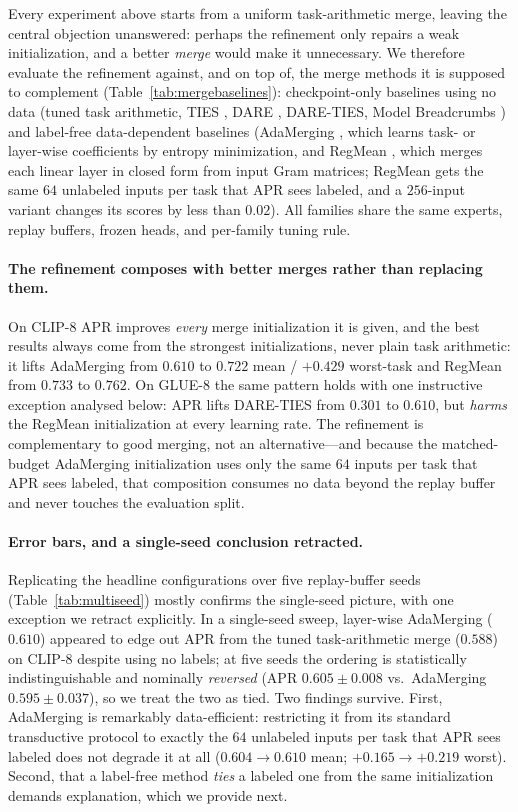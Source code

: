 \documentclass[11pt]{article}
\begin{document}
Every experiment above starts from a uniform task-arithmetic merge, leaving the central objection unanswered: perhaps the refinement only repairs a weak initialization, and a better \emph{merge} would make it unnecessary. We therefore evaluate the refinement against, and on top of, the merge methods it is supposed to complement (Table~\ref{tab:mergebaselines}): checkpoint-only baselines using no data (tuned task arithmetic, TIES \citep{yadav2023ties}, DARE \citep{yu2023dare}, DARE-TIES, Model Breadcrumbs \citep{davari2023breadcrumbs}) and label-free data-dependent baselines (AdaMerging \citep{yang2024adamerging}, which learns task- or layer-wise coefficients by entropy minimization, and RegMean \citep{jin2023regmean}, which merges each linear layer in closed form from input Gram matrices; RegMean gets the same $64$ unlabeled inputs per task that APR sees labeled, and a $256$-input variant changes its scores by less than $0.02$). All families share the same experts, replay buffers, frozen heads, and per-family tuning rule.

\paragraph{The refinement composes with better merges rather than replacing them.}
On CLIP-8 APR improves \emph{every} merge initialization it is given, and the best results always come from the strongest initializations, never plain task arithmetic: it lifts AdaMerging from $0.610$ to $\mathbf{0.722}$ mean / $\mathbf{+0.429}$ worst-task and RegMean from $0.733$ to $0.762$. On GLUE-8 the same pattern holds with one instructive exception analysed below: APR lifts DARE-TIES from $0.301$ to $0.610$, but \emph{harms} the RegMean initialization at every learning rate. The refinement is complementary to good merging, not an alternative---and because the matched-budget AdaMerging initialization uses only the same $64$ inputs per task that APR sees labeled, that composition consumes no data beyond the replay buffer and never touches the evaluation split.

\paragraph{Error bars, and a single-seed conclusion retracted.}
Replicating the headline configurations over five replay-buffer seeds (Table~\ref{tab:multiseed}) mostly confirms the single-seed picture, with one exception we retract explicitly. In a single-seed sweep, layer-wise AdaMerging ($0.610$) appeared to edge out APR from the tuned task-arithmetic merge ($0.588$) on CLIP-8 despite using no labels; at five seeds the ordering is statistically indistinguishable and nominally \emph{reversed} (APR $0.605\pm0.008$ vs.\ AdaMerging $0.595\pm0.037$), so we treat the two as tied. Two findings survive. First, AdaMerging is remarkably data-efficient: restricting it from its standard transductive protocol to exactly the $64$ unlabeled inputs per task that APR sees labeled does not degrade it at all ($0.604\to0.610$ mean; $+0.165\to+0.219$ worst). Second, that a label-free method \emph{ties} a labeled one from the same initialization demands explanation, which we provide next.
\end{document}
